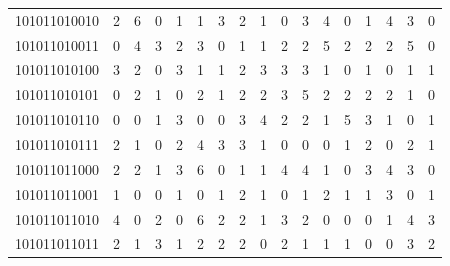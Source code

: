 \documentclass[10pt,a4paper]{article}
\begin{document}
\begin{longtable}{ |c|c|c|c|c|c|c|c|c|c|c|c|c|c|c|c|c| }
    101011010010              & 2                            & 6                                & 0                            & 1                              & 1   & 3   & 2   & 1   & 0   & 3   & 4   & 0   & 1   & 4   & 3   & 0   \\
    101011010011              & 0                            & 4                                & 3                            & 2                              & 3   & 0   & 1   & 1   & 2   & 2   & 5   & 2   & 2   & 2   & 5   & 0   \\
    101011010100              & 3                            & 2                                & 0                            & 3                              & 1   & 1   & 2   & 3   & 3   & 3   & 1   & 0   & 1   & 0   & 1   & 1   \\
    101011010101              & 0                            & 2                                & 1                            & 0                              & 2   & 1   & 2   & 2   & 3   & 5   & 2   & 2   & 2   & 2   & 1   & 0   \\
    101011010110              & 0                            & 0                                & 1                            & 3                              & 0   & 0   & 3   & 4   & 2   & 2   & 1   & 5   & 3   & 1   & 0   & 1   \\
    101011010111              & 2                            & 1                                & 0                            & 2                              & 4   & 3   & 3   & 1   & 0   & 0   & 0   & 1   & 2   & 0   & 2   & 1   \\
    101011011000              & 2                            & 2                                & 1                            & 3                              & 6   & 0   & 1   & 1   & 4   & 4   & 1   & 0   & 3   & 4   & 3   & 0   \\
    101011011001              & 1                            & 0                                & 0                            & 1                              & 0   & 1   & 2   & 1   & 0   & 1   & 2   & 1   & 1   & 3   & 0   & 1   \\
    101011011010              & 4                            & 0                                & 2                            & 0                              & 6   & 2   & 2   & 1   & 3   & 2   & 0   & 0   & 0   & 1   & 4   & 3   \\
    101011011011              & 2                            & 1                                & 3                            & 1                              & 2   & 2   & 2   & 0   & 2   & 1   & 1   & 1   & 0   & 0   & 3   & 2   \\

\end{longtable}
\end{document}
